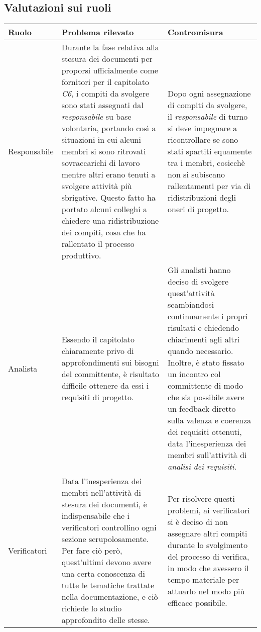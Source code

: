 	\subsection{Valutazioni sui ruoli}
	\begin{center}
	\begin{longtable}{|p{3cm}|p{6cm}|p{6cm}|}
	\hline
	\rowcolor{lighter-grayer}
	\textbf{Ruolo} & \textbf{Problema rilevato} & \textbf{Contromisura}\\
	\hline
	\endfirsthead


	\hline
	Responsabile
	 &
	Durante la fase relativa alla stesura dei documenti per proporsi ufficialmente come fornitori per il capitolato \textit{C6}, i compiti da svolgere sono stati assegnati dal \textit{responsabile} su base volontaria, portando così a situazioni in cui alcuni membri si sono ritrovati sovraccarichi di lavoro mentre altri erano tenuti a svolgere attività più sbrigative. Questo fatto ha portato alcuni colleghi a chiedere una ridistribuzione dei compiti, cosa che ha rallentato il processo produttivo.
	 	&
Dopo ogni assegnazione di compiti da svolgere, il \textit{responsabile} di turno si deve impegnare a ricontrollare se sono stati spartiti equamente tra i membri, cosicchè non si subiscano rallentamenti per via di ridistribuzioni degli oneri di progetto. \\
	\hline

		\hline
	Analista
	 &
	Essendo il capitolato chiaramente privo di approfondimenti sui bisogni del committente, è risultato difficile ottenere da essi i requisiti di progetto.
	 	&
Gli analisti hanno deciso di svolgere quest'attività scambiandosi continuamente i propri risultati e chiedendo chiarimenti agli altri quando necessario. Inoltre, è stato fissato un incontro col committente di modo che sia possibile avere un feedback diretto sulla valenza e coerenza dei requisiti ottenuti, data l'inesperienza dei membri sull'attività di \textit{analisi dei requisiti}. \\
	\hline

		\hline
	Verificatori
	 &
Data l'inesperienza dei membri nell'attività di stesura dei documenti, è indispensabile che i verificatori controllino ogni sezione scrupolosamente. Per fare ciò però, quest'ultimi devono avere una certa conoscenza di tutte le tematiche trattate nella documentazione, e ciò richiede lo studio approfondito delle stesse.
	 	&
Per risolvere questi problemi, ai verificatori si è deciso di non assegnare altri compiti durante lo svolgimento del processo di verifica, in modo che avessero il tempo materiale per attuarlo nel modo più efficace possibile. \\


\end{longtable}
\end{center}
